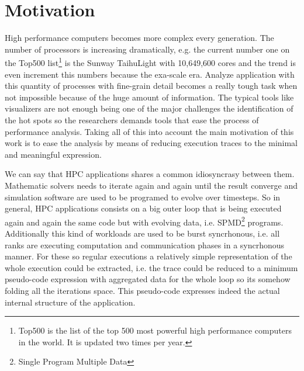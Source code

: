 \section{Motivation}

High performance computers becomes more complex every generation. The number of 
processors is increasing dramatically, e.g. the current number one on the Top500
 list\footnote{Top500 is the list of the top 500 most powerful high performance 
computers in the world. It is updated two times per year.} is the Sunway TaihuLight 
with 10,649,600 cores\cite{top500_2017} and the trend is even increment this
numbers because the exa-scale era. Analyze application with this quantity 
of processes with fine-grain detail becomes a really tough task when not
impossible because of the huge amount of information. The typical tools like 
visualizers are not enough being one of the major challenges the identification
of the hot spots so the researchers demands tools that ease the 
process of performance analysis. Taking all of this into account the main 
motivation of this work is to ease the analysis by means of reducing execution 
traces to the minimal and meaningful expression.

We can say that HPC applications shares a common idiosyncrasy between them. 
Mathematic solvers needs to iterate again and again until the result converge and 
simulation software are used to be programed to evolve over timesteps. So in 
general, HPC applications consists on a big outer loop that is being executed 
again and again the same code but with evolving data, i.e. SPMD\footnote{Single
Program Multiple Data} programs. Additionally this kind of workloads are used
to be burst syncrhonous, i.e. all ranks are executing computation and
communication phases in a syncrhonous manner. For these so regular executions a
relatively simple representation of the whole execution could be extracted, i.e.
the trace could be reduced to a minimum pseudo-code expression
with aggregated data for the whole loop so its somehow folding all the iterations
space. This pseudo-code expresses indeed the actual internal structure of the 
application.

